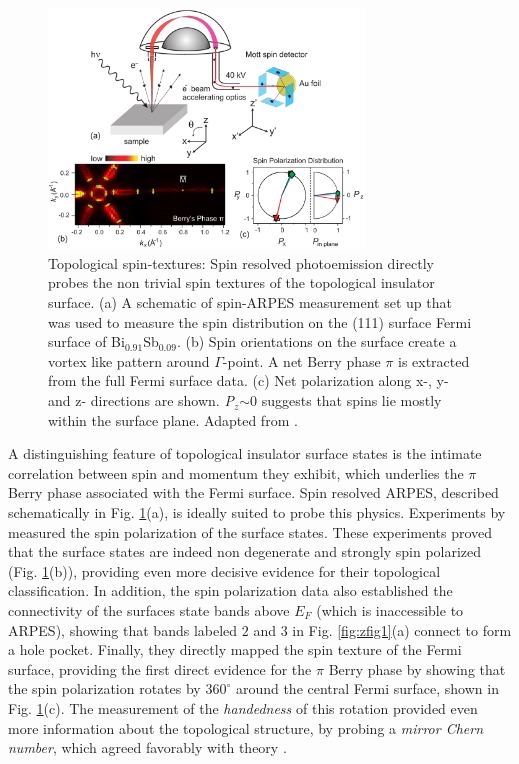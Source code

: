 \documentclass[twocolumn,floatfix,showpacs,rmp,aps]{revtex4}
\begin{document}
\begin{figure}
\includegraphics[width=3.3in]{Fig10}%
\caption{Topological spin-textures:
Spin resolved photoemission directly probes the non trivial spin textures
of the topological insulator surface.
(a) A schematic of spin-ARPES
measurement set up that was used to measure the spin
distribution on the (111) surface Fermi surface of
Bi$_{0.91}$Sb$_{0.09}$.  (b) Spin orientations on the surface create a
vortex like pattern around $\Gamma$-point. A net Berry phase
$\pi$ is extracted from the full Fermi surface data.
(c) Net polarization along x-, y- and z- directions are shown.
\textit{P$_z$}$\sim$0 suggests that spins lie mostly within the
surface plane.  Adapted from .  }
\label{fig:zfig2} \end{figure}

A distinguishing feature of topological insulator surface states is the
intimate correlation between spin and momentum they exhibit, which underlies
the $\pi$ Berry phase associated with the Fermi surface.  Spin resolved
ARPES, described schematically in Fig. \ref{fig:zfig2}(a),
 is ideally suited to probe this physics.
Experiments by \textcite{hsieh09a} measured the spin polarization of the surface
states.  These experiments proved that the surface states are indeed
non degenerate and strongly spin polarized (Fig. \ref{fig:zfig2}(b)),
providing even more decisive
evidence for their topological classification.
In addition, the spin polarization
data also established the connectivity of the
surfaces state bands above $E_F$ (which is inaccessible to ARPES),
showing that bands labeled $2$ and $3$ in Fig. \ref{fig:zfig1}(a) connect to
form a hole pocket.    Finally, they directly mapped
the spin texture of the Fermi surface,
providing the first direct evidence for
the $\pi$ Berry phase by showing that the spin polarization rotates by
$360^\circ$ around the central Fermi surface, shown in
Fig. \ref{fig:zfig2}(c).  The measurement of the {\it handedness} of this
rotation provided even more information about the topological structure,
by probing a {\it mirror Chern number}, which agreed favorably with theory \cite{teofukane08}.
\end{document}
